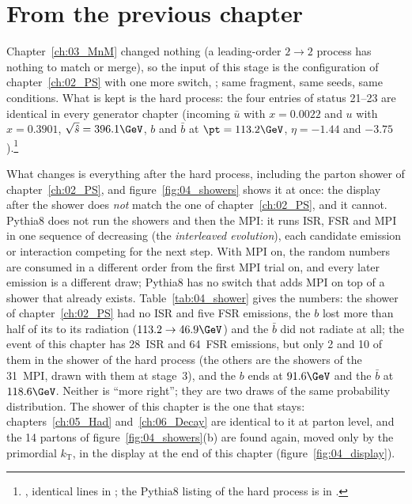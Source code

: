 \section{From the previous chapter}

Chapter~\ref{ch:03_MnM} changed nothing (a leading-order $2\to2$ process has nothing to match or merge), so the
input of this stage is the configuration of chapter~\ref{ch:02_PS} with one more switch,
; same fragment, same seeds, same conditions. What is kept is the hard process:
the four entries of status 21--23 are identical in every generator chapter (incoming $\bar u$ with $x=0.0022$
and $u$ with $x=0.3901$, $\sqrt{\hat s}=396.1\GeV$, $b$ and $\bar b$ at $\pt=113.2\GeV$, $\eta=-1.44$ and
$-3.75$).\footnote{, identical lines in ; the Pythia8 listing of the
hard process is in .}

What changes is everything after the hard process, including the parton shower of chapter~\ref{ch:02_PS}, and
figure~\ref{fig:04_showers} shows it at once: the display after the shower does \emph{not} match the one of
chapter~\ref{ch:02_PS}, and it cannot. Pythia8 does not run the showers and then the MPI: it runs ISR, FSR and MPI
in one sequence of decreasing \pt{} (the \emph{interleaved evolution}), each candidate emission or interaction
competing for the next step. With MPI on, the random numbers are consumed in a different order from the first MPI
trial on, and every later emission is a different draw; Pythia8 has no switch that adds MPI on top of a shower
that already exists. Table~\ref{tab:04_shower} gives the numbers: the shower of chapter~\ref{ch:02_PS} had no ISR
and five FSR emissions, the $b$ lost more than half of its \pt{} to its radiation ($113.2\to46.9\GeV$) and the
$\bar b$ did not radiate at all; the event of this chapter has 28~ISR and 64~FSR emissions, but only 2 and 10 of
them in the shower of the hard process (the others are the showers of the 31~MPI, drawn with them at stage~3), and
the $b$ ends at $91.6\GeV$ and the $\bar b$ at $118.6\GeV$. Neither is ``more right''; they are two draws of the
same probability distribution. The shower of this chapter is the one that stays: chapters~\ref{ch:05_Had}
and~\ref{ch:06_Decay} are identical to it at parton level, and the 14 partons of figure~\ref{fig:04_showers}(b)
are found again, moved only by the primordial $k_\mathrm{T}$, in the display at the end of this chapter
(figure~\ref{fig:04_display}).

